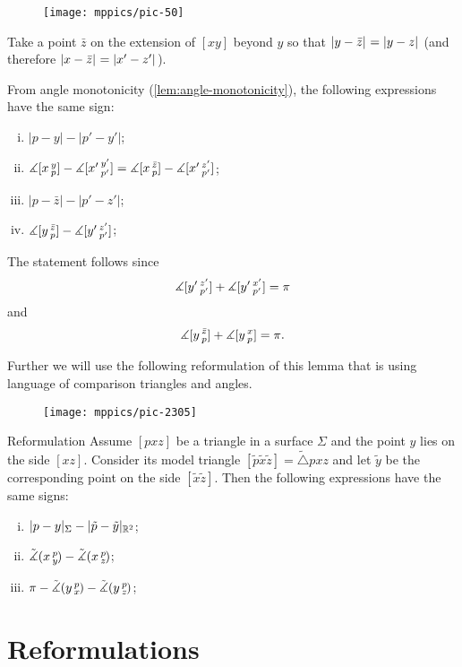 \begin{figure}[h!]
\vskip-0mm
\centering
\texttt{[image: mppics/pic-50]}
\vskip-0mm
\end{figure}

Take 
a point $\bar z$ on the extension of 
$[xy]$ beyond $y$ so that $\dist{y}{\bar z}{}=\dist{y}{z}{}$ (and therefore $\dist{x}{\bar z}{}=\dist{x'}{z'}{}$). 
 
From angle monotonicity (\ref{lem:angle-monotonicity}), 
the following expressions have the same sign:
\begin{enumerate}[(i)]
\item $|p-y|-|p'-y'|$;
\item $\measuredangle[x\,{}^{y}_{p}]-\measuredangle[x'\,{}^{y'}_{p'}]=\measuredangle[x\,{}^{\bar z}_{p}]-\measuredangle[x'\,{}^{z'}_{p'}]$;
\item $|p-\bar z|-|p'-z'|$;
\item $\measuredangle[y\,{}^{\bar z}_{p}]-\measuredangle[y'\,{}^{z'}_{p'}]$;
\end{enumerate}
The statement follows since
\[\measuredangle[y'\,{}^{z'}_{p'}]+\measuredangle[y'\,{}^{x'}_{p'}]=\pi\]
and
\[\measuredangle[y\,{}^{\bar z}_{p}]+\measuredangle[y\,{}^{x}_{p}]=\pi.\]
\qedsf

Further we will use the following reformulation of this lemma that is using language of comparison triangles and angles.

\begin{wrapfigure}{r}{25mm}
\vskip-0mm
\centering
\texttt{[image: mppics/pic-2305]}
\end{wrapfigure}

\begin{thm}{Reformulation}\label{lem:alex-reformulation}
Assume $[pxz]$ be a triangle in a surface $\Sigma$ and 
the point $y$ lies on the side $[xz]$.
Consider its model triangle $[\tilde p\tilde x\tilde z]=\tilde\triangle pxz$ and let $\tilde y$ be the corresponding point on the side $[\tilde x\tilde z]$.
Then the following expressions have the same signs:
\begin{enumerate}[(i)]
 \item $|p-y|_\Sigma-|\tilde p-\tilde y|_{\mathbb{R}^2}$;
 \item $\tilde\measuredangle(x\,{}^{p}_{y}\hspace{-0.2ex})-\tilde\measuredangle(x\,{}^{p}_{z}\hspace{-0.2ex})$;
 \item $\pi-\tilde\measuredangle(y\,{}^{p}_{x}\hspace{-0.2ex})-\tilde\measuredangle(y\,{}^{p}_{z}\hspace{-0.2ex})$;
\end{enumerate}
\end{thm}

\section{Reformulations}

